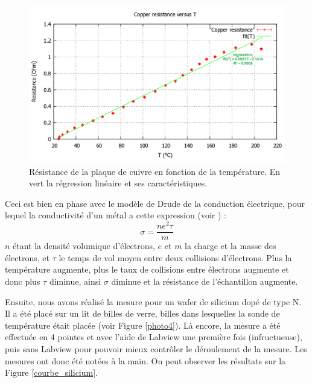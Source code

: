 \begin{figure}[hb]
  \begin{center}
		\includegraphics[width=12cm]{./images/Resistance_Cuivre_finale_english.png}
		\caption{Résistance de la plaque de cuivre en fonction de la température. En vert la régression linéaire et ses caractéristiques.}
		\label{courbe_cuivre}
	\end{center}
\end{figure}

\newpage

Ceci est bien en phase avec le modèle de Drude de la conduction électrique, pour lequel la conductivité d'un métal a cette expression (voir \cite{kittel_introduction_1976}) : 
\begin{equation}
	\sigma = \frac{n e^{2} \tau}{m}
\end{equation}
$n$ étant la densité volumique d'électrons, $e$ et $m$ la charge et la masse des électrons, et $\tau$ le temps de vol moyen entre deux collisions d'électrons. Plus la température augmente, plus le taux de collisions entre électrons augmente et donc plus $\tau$ diminue, ainsi $\sigma$ diminue et la résistance de l'échantillon augmente.

\bigskip

Ensuite, nous avons réalisé la mesure pour un wafer de silicium dopé de type N. Il a été placé sur un lit de billes de verre, billes dans lesquelles la sonde de température était placée (voir Figure \ref{photo4}). Là encore, la mesure a été effectuée en 4 pointes et avec l'aide de Labview une première fois (infructueuse), puis sans Labview pour pouvoir mieux contrôler le déroulement de la mesure. Les mesures ont donc été notées à la main. On peut observer les résultats sur la Figure \ref{courbe_silicium}.

